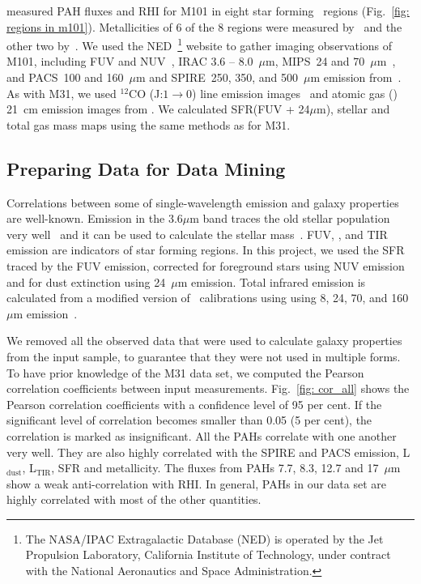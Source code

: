      \cite{Gordon08} measured PAH fluxes and RHI for M101 in eight star forming \hii~regions (Fig.~\ref{fig: regions in m101}).
     Metallicities of 6 of the 8 regions were measured by~\cite{Kennicutt03} and the other two by~\cite{Gordon08}.
     We used the NED~\footnote{The NASA/IPAC Extragalactic Database (NED) is operated by the Jet Propulsion Laboratory, California Institute of Technology, under contract with the National Aeronautics and Space Administration.} website to gather imaging observations of M101, including 
      \GALEX FUV and NUV~\citep{depaz07}, IRAC 3.6 -- 8.0~$\mu$m, MIPS~24 and 70~$\mu$m~\citep{Dale09}, and PACS~100 and 160~$\mu$m and SPIRE~250, 350, and 500~$\mu$m emission from~\cite{Kennicutt11}.
     As with M31, we used $^{12}$CO (J:$1\rightarrow0$) line emission images~\citep{Helfer03} and atomic gas (\hi) 21~cm emission images from \cite{Walter08}.
     We calculated SFR(FUV + 24$\mu$m), stellar and total gas mass maps using the same methods as for M31.
     
     \subsection{Preparing Data for Data Mining}
    
     Correlations between some of single-wavelength emission and galaxy properties are well-known.
     Emission in the 3.6$\mu$m band traces the old stellar population very well~\citep[e.g.][]{Smith07a,Leitherer99} and it can be used to calculate the stellar mass~\citep{Eskew12}.
     FUV, \halphadot, and TIR emission are indicators of star forming regions.
     In this project, we used the SFR traced by the FUV emission, corrected for foreground stars using NUV emission and for dust extinction using 24~$\mu$m emission.
     Total infrared emission is calculated from a modified version of~\cite{Draine07} calibrations using using 8, 24, 70, and 160~$\mu$m emission~\citep{Boquien10}.
    
    
    We removed all the observed data that were used to calculate galaxy properties from the input sample, to guarantee that they were not used in multiple forms.
    To have prior knowledge of the M31 data set, 
    we computed the Pearson correlation coefficients between input measurements.
    Fig.~\ref{fig: cor_all} shows the Pearson correlation coefficients with a confidence level of 95 per cent. 
    If the significant level of correlation becomes smaller than 0.05 (5 per cent), the correlation is marked as insignificant. 
    All the PAHs correlate with one another very well.
    They are also highly correlated with the SPIRE and PACS emission, L$_\mathrm{dust}$, L$_\mathrm{TIR}$, SFR and metallicity.
    The fluxes from PAHs 7.7, 8.3, 12.7 and 17~$\mu$m show a weak anti-correlation with RHI.
    In general, PAHs in our data set are highly correlated with most of the other quantities. 
    
